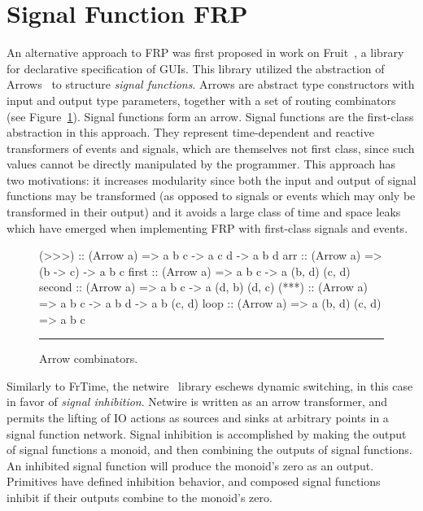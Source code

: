 \section{Signal Function FRP}
\label{section:Background-signal_function_frp}

An alternative approach to FRP was first proposed in work on
Fruit~\cite{Courtney2001-1}, a library for declarative specification of GUIs.
This library utilized the abstraction of Arrows~\cite{Hughes2000} to structure
{\em signal functions}. Arrows are abstract type constructors with input and
output type parameters, together with a set of routing combinators (see Figure~\ref{figure:arrow_combinators}).
Signal functions form an arrow. Signal functions are the first-class abstraction
in this approach. They represent time-dependent and reactive transformers of
events and signals, which are themselves not first class, since such values
cannot be directly manipulated by the programmer. This approach has two
motivations: it increases modularity since both the input and output of signal
functions may be transformed (as opposed to signals or events which may only be
transformed in their output) and it avoids a large class of time and space leaks
which have emerged when implementing FRP with first-class signals and events.

\begin{figure}
\begin{code}
(>>>)  :: (Arrow a) => a b c -> a c d -> a b d
arr    :: (Arrow a) => (b -> c) -> a b c
first  :: (Arrow a) => a b c -> a (b, d) (c, d)
second :: (Arrow a) => a b c -> a (d, b) (d, c)
(***)  :: (Arrow a) => a b c -> a b d -> a b (c, d)
loop   :: (Arrow a) => a (b, d) (c, d) => a b c
\end{code}
\hrule
\caption{Arrow combinators.}
\label{figure:arrow_combinators}
\end{figure}

Similarly to FrTime, the netwire~\cite{Soylemez} library eschews dynamic
switching, in this case in favor of {\em signal inhibition}. Netwire is written
as an arrow transformer, and permits the lifting of IO actions as sources and
sinks at arbitrary points in a signal function network. Signal inhibition is
accomplished by making the output of signal functions a monoid, and then
combining the outputs of signal functions. An inhibited signal function will
produce the monoid's zero as an output. Primitives have defined inhibition
behavior, and composed signal functions inhibit if their outputs combine to the
monoid's zero.

